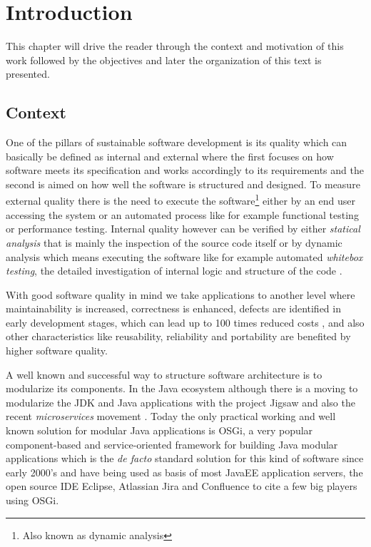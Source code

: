 \chapter{Introduction}
 This chapter will drive the reader through the context and motivation of this work followed by the objectives and later the organization of this text is presented.  
 

\section{Context}

One of the pillars of sustainable software development is its quality which can basically be defined as internal and external where the first focuses on how software meets its specification and works accordingly to its requirements and the second is aimed on how well the software is structured and designed. To measure external quality there is the need to execute the software\footnote{Also known as dynamic analysis} either by an end user accessing the system or an automated process like for example functional testing or performance testing. Internal quality however can be verified by either \emph{statical analysis} that is mainly the inspection of the source code itself or by dynamic analysis which means executing the software like for example automated \emph{whitebox testing}, the detailed investigation of internal logic and structure of the code \citep{Khan 2012}.   

With good software quality in mind we take applications to another level where maintainability is increased, correctness is enhanced, defects are identified in early development stages, which can lead up to 100 times reduced costs \citep{Beohm 2001}, and also other characteristics like reusability, reliability and portability are benefited by higher software quality.  

A well known and successful way to structure software architecture is to modularize its components. In the Java ecosystem although there is a moving to modularize the JDK and Java applications with the project Jigsaw \citep{Krill 2012} and also the recent \emph{microservices} movement \citep{Knorr 2014}. Today the only practical working and well known solution for modular Java applications is OSGi, a very popular component-based and service-oriented framework for building Java modular applications which is the \emph{de facto} standard solution for this kind of software since early 2000's and have being used as basis of most JavaEE application servers, the open source IDE Eclipse, Atlassian Jira and Confluence to cite a few big players using OSGi. 

